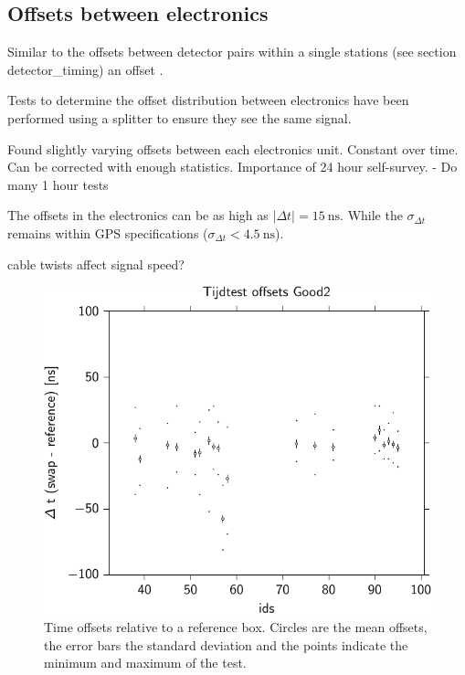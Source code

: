 \subsection{Offsets between \hisparc electronics}
\label{sub:gps_offsets}

Similar to the offsets between detector pairs within a single stations (see section detector_timing) an offset .

Tests to determine the offset distribution between \hisparc electronics
have been performed using a \gps splitter to ensure they see the same
\gps signal.

Found slightly varying offsets between each \hisparc electronics unit.
Constant over time. Can be corrected with enough statistics.
Importance of 24 hour self-survey. - Do many 1 hour tests


The offsets in the \hisparc electronics can be as high as $|\Delta t| =
\SI{15}{\nano\second}$. While the $\sigma_{\Delta t}$ remains within GPS
specifications ($\sigma_{\Delta t} < \SI{4.5}{\nano\second}$).


\gps cable twists affect signal speed?

\begin{figure}
    \centering
    \includegraphics{plots/calibration/hisparc_offsets}
    \caption{Time offsets relative to a reference box. Circles are the
             mean offsets, the error bars the standard deviation and the
             points indicate the minimum and maximum of the test.}
    \label{fig:hisparc_offsets}
\end{figure}



